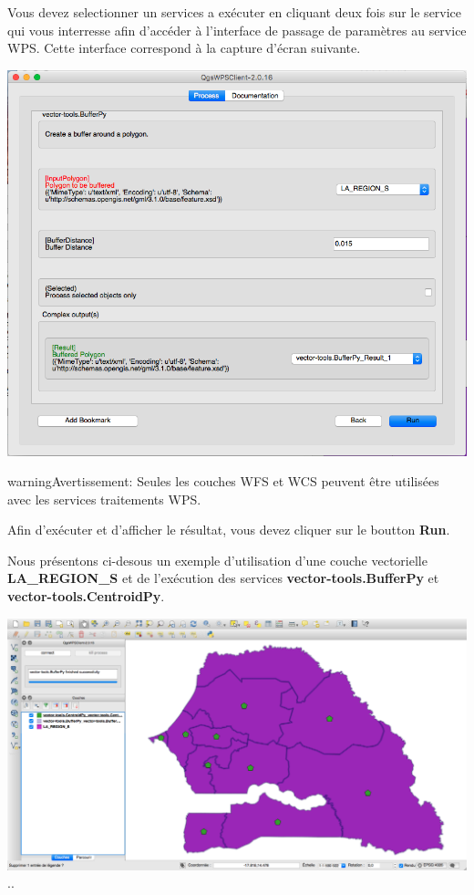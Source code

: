 \documentclass[letterpaper,10pt,french]{sphinxmanual}
\begin{document}
Vous devez selectionner un services a exécuter en cliquant deux fois
sur le service qui vous interresse afin d'accéder à l'interface de
passage de paramètres au service WPS. Cette interface correspond à la
capture d'écran suivante.

\includegraphics{qgis-wps-buff.png}

\begin{notice}{warning}{Avertissement:}
Seules les couches WFS et WCS peuvent être utilisées avec les
services traitements WPS.
\end{notice}

Afin d'exécuter et d'afficher le résultat, vous devez cliquer sur le
boutton \textbf{Run}.

Nous présentons ci-desous un exemple d'utilisation d'une couche
vectorielle \textbf{LA\_REGION\_S} et de l'exécution des services
\textbf{vector-tools.BufferPy} et \textbf{vector-tools.CentroidPy}.

\includegraphics{qgis-wps-result.png}
..
\end{document}
